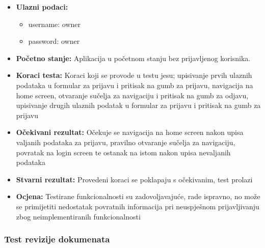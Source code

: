 			\begin{itemize}
				
				\item{\textbf{Ulazni podaci:}}
				\begin{itemize}
					\item{username: owner}
					\item{password: owner}
				\end{itemize}
				
				\item{\textbf{Početno stanje:} Aplikacija u početnom stanju bez prijavljenog korisnika.}
				
				\item{\textbf{Koraci testa:} Koraci koji se provode u testu jesu; upisivanje prvih ulaznih podataka u formular za prijavu i pritisak na gumb za prijavu, navigacija na home screen, otvaranje sučelja za navigaciju i pritisak na gumb za odjavu, upisivanje drugih ulaznih podatak u formular za prijavu i pritisak na gumb za prijavu}
				
				\item{\textbf{Očekivani rezultat:} Očekuje se navigacija na home screen nakon upisa valjanih podataka za prijavu, pravilno otvaranje sučelja za navigaciju, povratak na login screen te ostanak na istom nakon upisa nevaljanih podataka}
				
				\item{\textbf{Stvarni rezultat:} Provedeni koraci se poklapaju s očekivanim, test prolazi}
				
				\item{\textbf{Ocjena:} Testirane funkcionalnosti su zadovoljavajuće, rade ispravno, no može se primijetiti nedostatak povratnih informacija pri neuspješnom prijavljivanju zbog neimplementiranih funkcionalnosti}
				
			\end{itemize}
			
			\subsubsection{Test revizije dokumenata}
			
